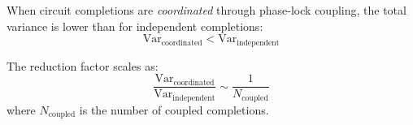 \begin{theorem}
\label{thm:coordinated_completion}
When circuit completions are \textit{coordinated} through phase-lock coupling, the total variance is lower than for independent completions:
\begin{equation}
\text{Var}_{\text{coordinated}} < \text{Var}_{\text{independent}}
\end{equation}

The reduction factor scales as:
\begin{equation}
\frac{\text{Var}_{\text{coordinated}}}{\text{Var}_{\text{independent}}} \sim \frac{1}{N_{\text{coupled}}}
\end{equation}
where $N_{\text{coupled}}$ is the number of coupled completions.
\end{theorem}

